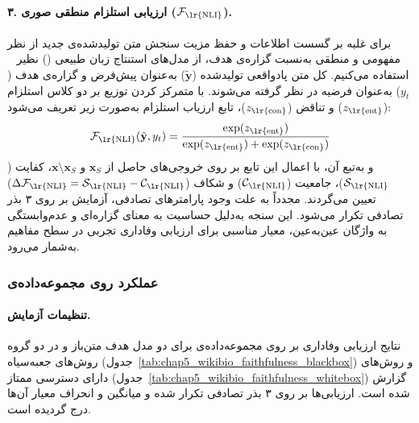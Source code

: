 \paragraph{۳. ارزیابی استلزام منطقی صوری ($\mathcal{F}_{\text{\lr{NLI}}}$).}
برای غلبه بر گسست اطلاعات و حفظ مزیت سنجش متن تولیدشده‌ی جدید از نظر مفهومی و منطقی به‌نسبت گزاره‌ی هدف، از مدل‌های استنتاج زبان طبیعی () نظیر ~\cite{he2023debertav} استفاده می‌کنیم. کل متن پادواقعی تولیدشده ($\tilde{\mathbf{y}}$) به‌عنوان پیش‌فرض و گزاره‌ی هدف ($y_t$) به‌عنوان فرضیه در نظر گرفته می‌شوند. با متمرکز کردن توزیع بر دو کلاس استلزام ($z_{\text{\lr{ent}}}$) و تناقض ($z_{\text{\lr{con}}}$)، تابع ارزیاب استلزام به‌صورت زیر تعریف می‌شود:
\begin{equation}
    \mathcal{F}_{\text{\lr{NLI}}}(\tilde{\mathbf{y}}, y_t) = \frac{\exp(z_{\text{\lr{ent}}})}{\exp(z_{\text{\lr{ent}}}) + \exp(z_{\text{\lr{con}}})}
\end{equation}
و به‌تبع آن، با اعمال این تابع بر روی خروجی‌های حاصل از $\mathbf{x}_S$ و $\mathbf{x} \setminus \mathbf{x}_S$، کفایت ($\mathcal{S}_{\text{\lr{NLI}}}$)، جامعیت ($\mathcal{C}_{\text{\lr{NLI}}}$) و شکاف ($\Delta\mathcal{F}_{\text{\lr{NLI}}} = \mathcal{S}_{\text{\lr{NLI}}} - \mathcal{C}_{\text{\lr{NLI}}}$) تعیین می‌گردند. مجدداً به علت وجود پارامترهای تصادفی، آزمایش بر روی ۳ بذر تصادفی تکرار می‌شود. این سنجه به‌دلیل حساسیت به معنای گزاره‌ای و عدم‌وابستگی به واژگان عین‌به‌عین، معیار مناسبی برای ارزیابی وفاداری تجربی در سطح مفاهیم به‌شمار می‌رود.


\subsubsection{عملکرد روی مجموعه‌داده‌ی }\label{sec:5-3-2-1}


\paragraph{تنظیمات آزمایش.}
نتایج ارزیابی وفاداری بر روی مجموعه‌داده‌ی  برای دو مدل هدف متن‌باز  و  در دو گروه روش‌های جعبه‌سیاه (جدول~\ref{tab:chap5_wikibio_faithfulness_blackbox}) و روش‌های دارای دسترسی ممتاز (جدول~\ref{tab:chap5_wikibio_faithfulness_whitebox}) گزارش شده است. ارزیابی‌ها بر روی ۳ بذر تصادفی تکرار شده و میانگین و انحراف معیار آن‌ها درج گردیده است.

